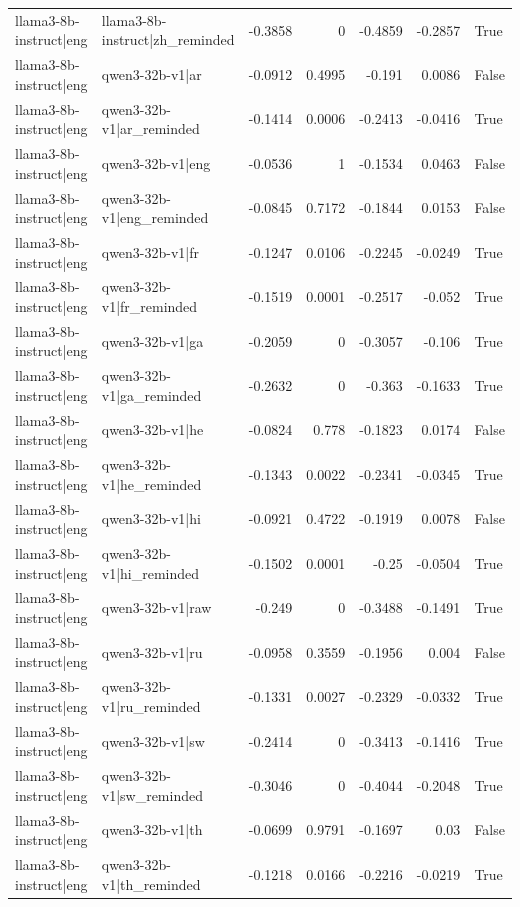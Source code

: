 \begin{table}
\begin{tabular}{l l r r r r l}
llama3-8b-instruct|eng & llama3-8b-instruct|zh_reminded & -0.3858 & 0 & -0.4859 & -0.2857 & True \\
llama3-8b-instruct|eng & qwen3-32b-v1|ar & -0.0912 & 0.4995 & -0.191 & 0.0086 & False \\
llama3-8b-instruct|eng & qwen3-32b-v1|ar_reminded & -0.1414 & 0.0006 & -0.2413 & -0.0416 & True \\
llama3-8b-instruct|eng & qwen3-32b-v1|eng & -0.0536 & 1 & -0.1534 & 0.0463 & False \\
llama3-8b-instruct|eng & qwen3-32b-v1|eng_reminded & -0.0845 & 0.7172 & -0.1844 & 0.0153 & False \\
llama3-8b-instruct|eng & qwen3-32b-v1|fr & -0.1247 & 0.0106 & -0.2245 & -0.0249 & True \\
llama3-8b-instruct|eng & qwen3-32b-v1|fr_reminded & -0.1519 & 0.0001 & -0.2517 & -0.052 & True \\
llama3-8b-instruct|eng & qwen3-32b-v1|ga & -0.2059 & 0 & -0.3057 & -0.106 & True \\
llama3-8b-instruct|eng & qwen3-32b-v1|ga_reminded & -0.2632 & 0 & -0.363 & -0.1633 & True \\
llama3-8b-instruct|eng & qwen3-32b-v1|he & -0.0824 & 0.778 & -0.1823 & 0.0174 & False \\
llama3-8b-instruct|eng & qwen3-32b-v1|he_reminded & -0.1343 & 0.0022 & -0.2341 & -0.0345 & True \\
llama3-8b-instruct|eng & qwen3-32b-v1|hi & -0.0921 & 0.4722 & -0.1919 & 0.0078 & False \\
llama3-8b-instruct|eng & qwen3-32b-v1|hi_reminded & -0.1502 & 0.0001 & -0.25 & -0.0504 & True \\
llama3-8b-instruct|eng & qwen3-32b-v1|raw & -0.249 & 0 & -0.3488 & -0.1491 & True \\
llama3-8b-instruct|eng & qwen3-32b-v1|ru & -0.0958 & 0.3559 & -0.1956 & 0.004 & False \\
llama3-8b-instruct|eng & qwen3-32b-v1|ru_reminded & -0.1331 & 0.0027 & -0.2329 & -0.0332 & True \\
llama3-8b-instruct|eng & qwen3-32b-v1|sw & -0.2414 & 0 & -0.3413 & -0.1416 & True \\
llama3-8b-instruct|eng & qwen3-32b-v1|sw_reminded & -0.3046 & 0 & -0.4044 & -0.2048 & True \\
llama3-8b-instruct|eng & qwen3-32b-v1|th & -0.0699 & 0.9791 & -0.1697 & 0.03 & False \\
llama3-8b-instruct|eng & qwen3-32b-v1|th_reminded & -0.1218 & 0.0166 & -0.2216 & -0.0219 & True \\

\end{tabular}
\end{table}
